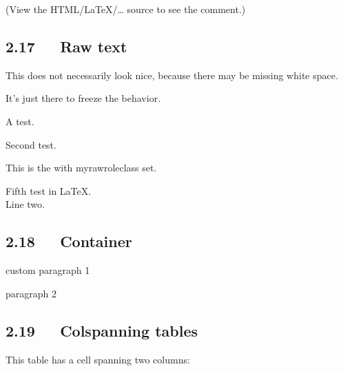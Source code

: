 \documentclass[a4paper]{article}
\begin{document}
% 
% 

(View the HTML/LaTeX/… source to see the comment.)


\subsection{2.17   Raw text%
  \label{raw-text}%
}

This does not necessarily look nice, because there may be missing white space.

It’s just there to freeze the behavior.

A test.

Second test.


This is the  with myrawroleclass set.

Fifth test in LaTeX.\\Line two.


\subsection{2.18   Container%
  \label{container}%
}

\begin{DUclass}{custom}
paragraph 1

paragraph 2
\end{DUclass}



\subsection{2.19   Colspanning tables%
  \label{colspanning-tables}%
}

This table has a cell spanning two columns:
\end{document}
